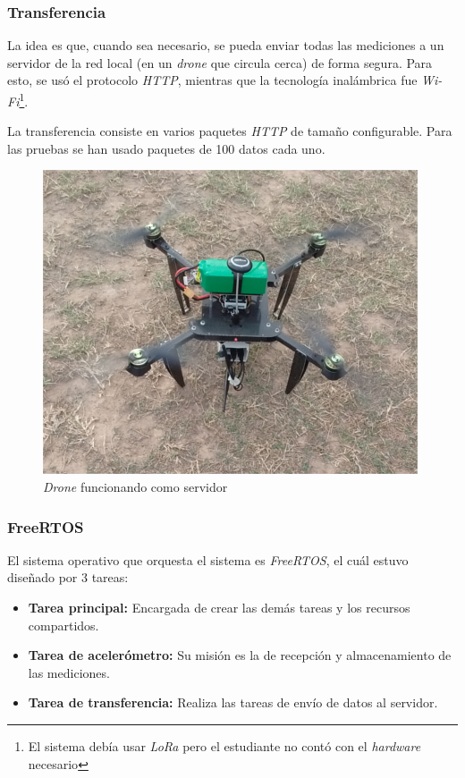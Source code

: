 \documentclass{article}
\newcommand{ \fnwifi }{\footnote{El sistema debía usar \emph{LoRa} pero el estudiante no contó con el \emph{hardware} necesario}}
\begin{document}
    \subsubsection{Transferencia}
    La idea es que, cuando sea necesario, se pueda enviar todas las mediciones
    a un servidor de la red local (en un \emph{drone} que circula cerca) de 
    forma segura. Para esto, se usó el protocolo \emph{HTTP}, mientras que 
    la tecnología inalámbrica fue \emph{Wi-Fi}\fnwifi. \par
    La transferencia consiste en varios paquetes \emph{HTTP} de tamaño 
    configurable. Para las pruebas se han usado paquetes de 100 datos cada uno.

    \begin{figure}[h]
        \includegraphics[width=0.8 \textwidth, center]{../segundas/drone.jpg}
        \caption{\emph{Drone} funcionando como servidor}
        \label{fig:drone}
    \end{figure}

    \subsubsection{FreeRTOS}
    El sistema operativo que orquesta el sistema es \emph{FreeRTOS}, el cuál
    estuvo diseñado por 3 tareas:
    \begin{itemize}
        \item \textbf{Tarea principal:} Encargada de crear las demás tareas y 
        los recursos compartidos.
        \item \textbf{Tarea de acelerómetro:} Su misión es la de recepción y 
        almacenamiento de las mediciones.
        \item \textbf{Tarea de transferencia:} Realiza las tareas de envío
        de datos al servidor.
    \end{itemize}
\end{document}
